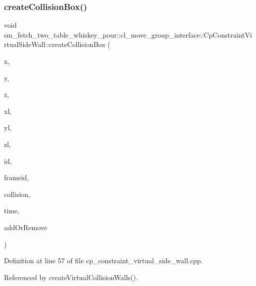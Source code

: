 \subsubsection{\texorpdfstring{create\+Collision\+Box()}{createCollisionBox()}\hspace{0.1cm}{\footnotesize\ttfamily [2/2]}}
{\footnotesize\ttfamily void sm\+\_\+fetch\+\_\+two\+\_\+table\+\_\+whiskey\+\_\+pour\+::cl\+\_\+move\+\_\+group\+\_\+interface\+::\+Cp\+Constraint\+Virtual\+Side\+Wall\+::create\+Collision\+Box (\begin{DoxyParamCaption}\item[{float}]{x,  }\item[{float}]{y,  }\item[{float}]{z,  }\item[{float}]{xl,  }\item[{float}]{yl,  }\item[{float}]{zl,  }\item[{std\+::string}]{id,  }\item[{std\+::string}]{frameid,  }\item[{moveit\+\_\+msgs\+::\+Collision\+Object \&}]{collision,  }\item[{const ros\+::\+Time \&}]{time,  }\item[{int}]{add\+Or\+Remove }\end{DoxyParamCaption})}



Definition at line 57 of file cp\+\_\+constraint\+\_\+virtual\+\_\+side\+\_\+wall.\+cpp.



Referenced by create\+Virtual\+Collision\+Walls().


